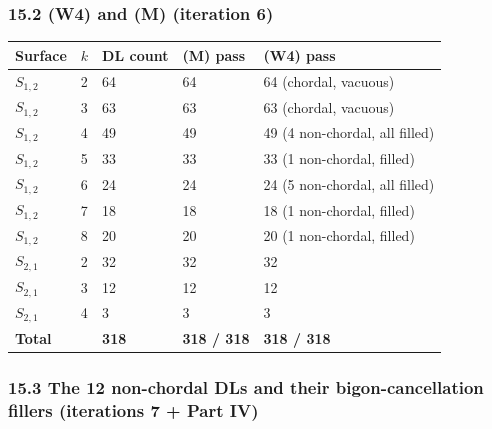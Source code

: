 \documentclass[
]{article}
\newcounter{none} %
\begin{document}
\subsubsection{15.2 (W4) and (M) (iteration
6)}\label{w4-and-m-iteration-6}

{\def\LTcaptype{none} %
\begin{longtable}[]{@{}lllll@{}}
\toprule\noalign{}
Surface & \(k\) & DL count & (M) pass & (W4) pass \\
\midrule\noalign{}
\endhead
\bottomrule\noalign{}
\endlastfoot
\(S_{1,2}\) & 2 & 64 & 64 & 64 (chordal, vacuous) \\
\(S_{1,2}\) & 3 & 63 & 63 & 63 (chordal, vacuous) \\
\(S_{1,2}\) & 4 & 49 & 49 & 49 (4 non-chordal, all filled) \\
\(S_{1,2}\) & 5 & 33 & 33 & 33 (1 non-chordal, filled) \\
\(S_{1,2}\) & 6 & 24 & 24 & 24 (5 non-chordal, all filled) \\
\(S_{1,2}\) & 7 & 18 & 18 & 18 (1 non-chordal, filled) \\
\(S_{1,2}\) & 8 & 20 & 20 & 20 (1 non-chordal, filled) \\
\(S_{2,1}\) & 2 & 32 & 32 & 32 \\
\(S_{2,1}\) & 3 & 12 & 12 & 12 \\
\(S_{2,1}\) & 4 & 3 & 3 & 3 \\
\textbf{Total} & & \textbf{318} & \textbf{318 / 318} & \textbf{318 /
318} \\
\end{longtable}
}

\subsubsection{15.3 The 12 non-chordal DLs and their bigon-cancellation
fillers (iterations 7 + Part
IV)}\label{the-12-non-chordal-dls-and-their-bigon-cancellation-fillers-iterations-7-part-iv}
\end{document}
